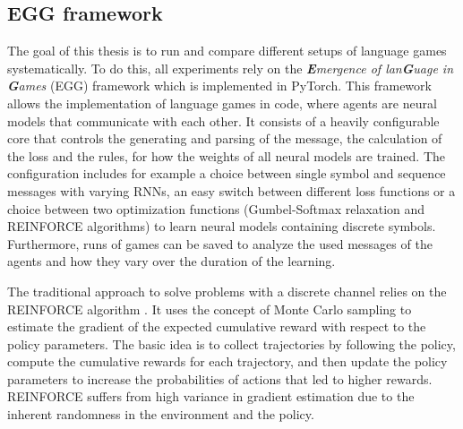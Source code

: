 \subsection{EGG framework}
The goal of this thesis is to run and compare different setups of language games systematically.
To do this, all experiments rely on the \emph{\textbf{E}mergence of lan\textbf{G}uage in \textbf{G}ames} (EGG) framework \citep{Kharitonov2019} which is implemented in PyTorch.
This framework allows the implementation of language games in code, where agents are neural models that communicate with each other.
It consists of a heavily configurable core that controls the generating and parsing of the message, the calculation of the loss and the rules, for how the weights of all neural models are trained.
The configuration includes for example a choice between single symbol and sequence messages with varying RNNs, an easy switch between different loss functions or a choice between two optimization functions (Gumbel-Softmax relaxation and REINFORCE algorithms) to learn neural models containing discrete symbols.
Furthermore, runs of games can be saved to analyze the used messages of the agents and how they vary over the duration of the learning.

The traditional approach to solve problems with a discrete channel relies on the REINFORCE algorithm \citep{Williams1992}.
It uses the concept of Monte Carlo sampling to estimate the gradient of the expected cumulative reward with respect to the policy parameters.
The basic idea is to collect trajectories by following the policy, compute the cumulative rewards for each trajectory, and then update the policy parameters to increase the probabilities of actions that led to higher rewards.
REINFORCE suffers from high variance in gradient estimation due to the inherent randomness in the environment and the policy.

